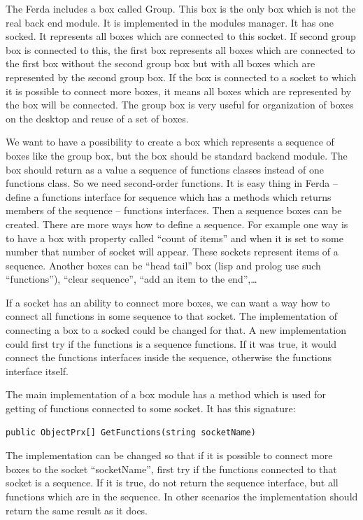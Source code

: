 \documentclass[a4paper,12pt]{book}
\begin{document}
The Ferda includes a box called Group. This box is the only box which is not the real back end module. It is implemented in the modules manager. It has one socked. It represents all boxes which are connected to this socket. If second group box is connected to this, the first box represents all boxes which are connected to the first box without the second group box but with all boxes which are represented by the second group box. If the box is connected to a socket to which it is possible to connect more boxes, it means all boxes which are represented by the box will be connected. The group box is very useful for organization of boxes on the desktop and reuse of a set of boxes.

We want to have a possibility to create a box which represents a sequence of boxes like the group box, but the box should be standard backend module. The box should return as a value a sequence of functions classes instead of one functions class. So we need second-order functions. It is easy thing in Ferda -- define a functions interface for sequence which has a methods which returns members of the sequence -- functions interfaces. Then a sequence boxes can be created. There are more ways how to define a sequence. For example one way is to have a box with property called ``count of items'' and when it is set to some number that number of socket will appear. These sockets represent items of a sequence. Another boxes can be ``head tail'' box (lisp and prolog use such ``functions''), ``clear sequence'',  ``add an item to the end'',…

If a socket has an ability to connect more boxes, we can want a way how to connect all functions in some sequence to that socket. The implementation of connecting a box to a socked could be changed for that. A new implementation could first try if the functions is a sequence functions. If it was true, it would connect the functions interfaces inside the sequence, otherwise the functions interface itself.

The main implementation of a box module has a method which is used for getting of functions connected to some socket. It has this signature:
\begin{verbatim}
public ObjectPrx[] GetFunctions(string socketName)
\end{verbatim}

The implementation can be changed so that if it is possible to connect more boxes to the socket ``socketName'', first try if the functions connected to that socket is a sequence. If it is true, do not return the sequence interface, but all functions which are in the sequence. In other scenarios the implementation should return the same result as it does.
\end{document}
